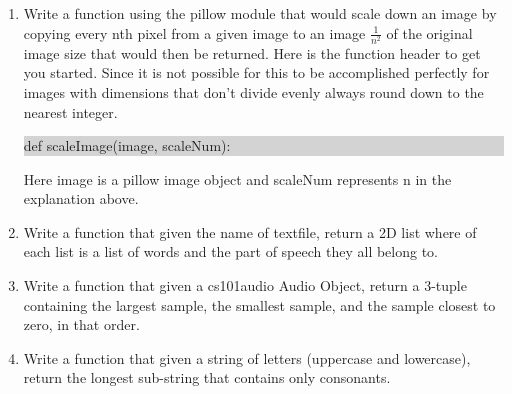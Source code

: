 \documentclass[11pt, letterpaper, onecolumn, oneside, final]{article}
\begin{document}
\maketitle


\begin{enumerate}
    \item Write a function using the {\consolas pillow} module that would scale down an image by copying every nth pixel from a given image to an image \(\frac{1}{n^2}\) of the original image size that would then be returned. Here is the function header to get you started. Since it is not possible for this to be accomplished perfectly for images with dimensions that don't divide evenly always round down to the nearest integer.
    \begin{center}
    \colorbox{lightgray}{\parbox{.41\textwidth}{\consolas def scaleImage(image, scaleNum):}}
    \end{center}
    Here {\consolas image} is a {\consolas pillow} image object and {\consolas scaleNum} represents n in the explanation above.  
    
    \item Write a function that given the name of textfile, return a 2D list where of each list is a list of words and the part of speech they all belong to. 

    \item Write a function that given a cs101audio Audio Object, return a 3-tuple containing the largest sample, the smallest sample, and the sample closest to zero, in that order. 
    
    \item Write a function that given a string of letters (uppercase and lowercase), return the longest sub-string that contains only consonants.


\end{enumerate}
\end{document}
